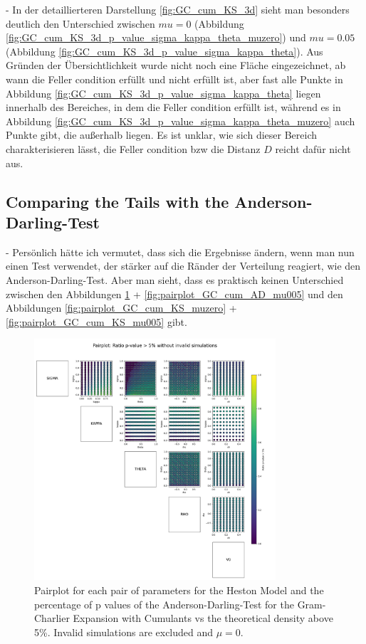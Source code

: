 - In der detaillierteren Darstellung \ref{fig:GC_cum_KS_3d} sieht man besonders deutlich den Unterschied zwischen $mu=0$ (Abbildung \ref{fig:GC_cum_KS_3d_p_value_sigma_kappa_theta_muzero}) und $mu=0.05$ (Abbildung \ref{fig:GC_cum_KS_3d_p_value_sigma_kappa_theta}). Aus Gründen der Übersichtlichkeit wurde nicht noch eine Fläche eingezeichnet, ab wann die Feller condition erfüllt und nicht erfüllt ist, aber fast alle Punkte in Abbildung \ref{fig:GC_cum_KS_3d_p_value_sigma_kappa_theta} liegen innerhalb des Bereiches, in dem die Feller condition erfüllt ist, während es in Abbildung \ref{fig:GC_cum_KS_3d_p_value_sigma_kappa_theta_muzero} auch Punkte gibt, die außerhalb liegen. Es ist unklar, wie sich dieser Bereich charakterisieren lässt, die Feller condition bzw die Distanz $D$ reicht dafür nicht aus.

\subsection{Comparing the Tails with the Anderson-Darling-Test}

- Persönlich hätte ich vermutet, dass sich die Ergebnisse ändern, wenn man nun einen Test verwendet, der stärker auf die Ränder der Verteilung reagiert, wie den Anderson-Darling-Test. Aber man sieht, dass es praktisch keinen Unterschied zwischen den Abbildungen \ref{fig:pairplot_GC_cum_AD_muzero} + \ref{fig:pairplot_GC_cum_AD_mu005} und den Abbildungen \ref{fig:pairplot_GC_cum_KS_muzero} + \ref{fig:pairplot_GC_cum_KS_mu005} gibt.

\begin{figure}
    \centering
    \includegraphics[width=0.8\textwidth]{img/pairplot_GC_cum_AD_muzero.png}
    \caption{Pairplot for each pair of parameters for the Heston Model and the percentage of p values of the Anderson-Darling-Test for the Gram-Charlier Expansion with Cumulants vs the theoretical density above 5\%. Invalid simulations are excluded and $\mu=0$.}
    \label{fig:pairplot_GC_cum_AD_muzero}
\end{figure}

